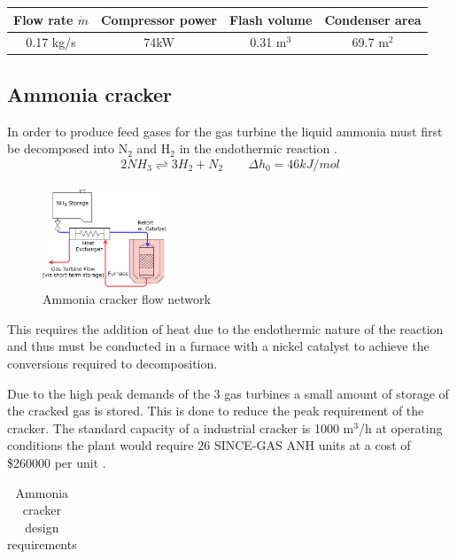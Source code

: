 \documentclass[11pt, a4paper]{article}
\begin{document}
{\begin{table}[!htbp]
\begin{center}
\begin{tabular}{ |c|c|c|c| }
			Flow rate $\dot{m}$ & Compressor power&Flash volume &Condenser area\\
			\hline
			0.17 kg/s& 74kW & 0.31 m$^3$ &69.7 m$^2$ \\
		
			
			\hline
		\end{tabular}
	\end{center}
\end{table}
\subsection{Ammonia cracker}
In order to produce feed gases for the gas turbine the liquid ammonia must first be decomposed into N$_2$ and H$_2$ in the endothermic reaction \cite{Kim2012}. 
\begin{equation}
2NH_3   \underset{ }{\stackrel{ }{\rightleftharpoons}}   3H_2 + N_2 \qquad \Delta h_0 = 46 kJ/mol 
\end{equation}
\begin{figure}
	\centering
	\includegraphics[width=0.33\textwidth]{ammcrack}
	\caption{Ammonia cracker flow network}
\end{figure}
This requires the addition of heat due to the endothermic nature of the reaction and thus must be conducted in a furnace with a nickel catalyst to achieve the conversions required to decomposition.

Due to the high peak demands of the 3 gas turbines a small amount of storage of the cracked gas is stored. This is done to reduce the peak requirement of the cracker. The standard capacity of a industrial cracker is 1000 m$^3$/h at operating conditions the plant would require 26 SINCE-GAS ANH units  at a cost of \$260000 per unit \cite{SinceGas2018}. 
\begin{table}[!htbp]
	\begin{center}
		\caption{Ammonia cracker design requirements}
		\begin{tabular}{ |l|l|  }
			

\end{tabular}
\end{center}
\end{table}}
\end{document}
